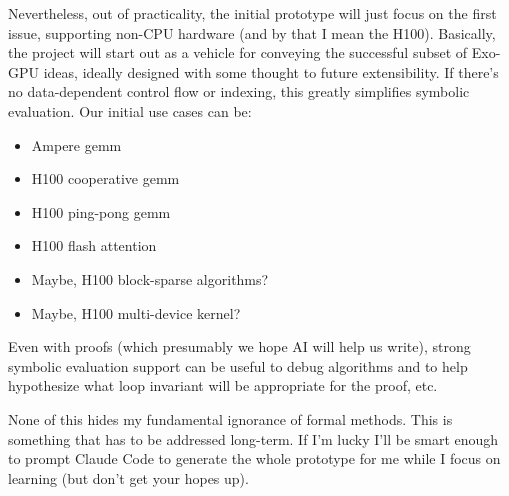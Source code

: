 Nevertheless, out of practicality, the initial prototype will just focus on the first issue, supporting non-CPU hardware (and by that I mean the H100).
Basically, the project will start out as a vehicle for conveying the successful subset of Exo-GPU ideas, ideally designed with some thought to future extensibility.
If there's no data-dependent control flow or indexing, this greatly simplifies symbolic evaluation.
Our initial use cases can be:
\begin{itemize}
  \item Ampere gemm
  \item H100 cooperative gemm
  \item H100 ping-pong gemm
  \item H100 flash attention
  \item Maybe, H100 block-sparse algorithms?
  \item Maybe, H100 multi-device kernel?
\end{itemize}
Even with proofs (which presumably we hope AI will help us write), strong symbolic evaluation support can be useful to debug algorithms and to help hypothesize what loop invariant will be appropriate for the proof, etc.

None of this hides my fundamental ignorance of formal methods.
This is something that has to be addressed long-term.
If I'm lucky I'll be smart enough to prompt Claude Code to generate the whole prototype for me while I focus on learning (but don't get your hopes up).
